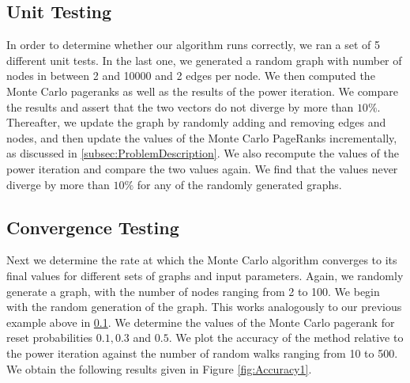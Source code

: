 \documentclass[sigconf]{acmart}
\theoremstyle{definition}
\begin{document}
\subsection{Unit Testing}
\label{subsec:UnitTesting}
In order to determine whether our algorithm runs correctly, we ran a set of 5 different unit tests. In the last one, we generated a random graph with number of nodes in between 2 and 10000 and 2 edges per node. We then computed the Monte Carlo pageranks as well as the results of the power iteration. We compare the results and assert that the two vectors do not diverge by more than $10\%$. Thereafter, we update the graph by randomly adding and removing edges and nodes, and then update the values of the Monte Carlo PageRanks incrementally, as discussed in \ref{subsec:ProblemDescription}. We also recompute the values of the power iteration and compare the two values again. We find that the values never diverge by more than $10\%$ for any of the randomly generated graphs. 
\subsection{Convergence Testing}
\label{subsec:ConvergenceTesting}
Next we determine the rate at which the Monte Carlo algorithm converges to its final values for different sets of graphs and input parameters. Again, we randomly generate a graph, with the number of nodes ranging from 2 to 100. We begin with the random generation of the graph. This works analogously to our previous example above in \ref{subsec:UnitTesting}. We determine the values of the Monte Carlo pagerank for reset probabilities $0.1, 0.3$ and $0.5$. We plot the accuracy of the method relative to the power iteration against the number of random walks ranging from 10 to 500. We obtain the following results given in Figure \ref{fig:Accuracy1}. \vspace{1em}\\
\end{document}
